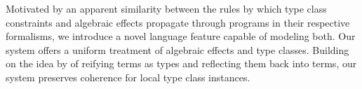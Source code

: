 Motivated by an apparent similarity between the rules by which type class constraints and algebraic effects propagate through programs in their respective formalisms, we introduce a novel language feature capable of modeling both. Our system offers a uniform treatment of algebraic effects and type classes. Building on the idea by \citet{kiselyov04} of reifying terms as types and reflecting them back into terms, our system preserves coherence for local type class instances.
